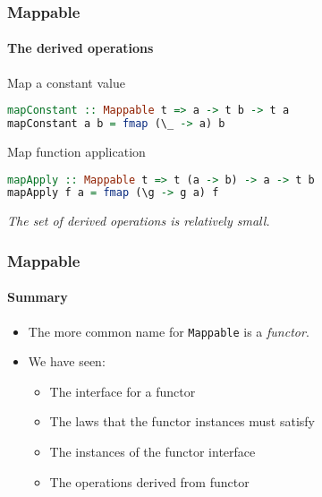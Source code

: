 \begin{frame}[fragile]
\frametitle{Mappable}
\framesubtitle{The derived operations}
\begin{block}{Map a constant value}
\begin{lstlisting}[style=language,language=haskell]
mapConstant :: Mappable t => a -> t b -> t a
mapConstant a b = fmap (\_ -> a) b
\end{lstlisting}
\end{block}
\begin{block}{Map function application}
\begin{lstlisting}[style=language,language=haskell]
mapApply :: Mappable t => t (a -> b) -> a -> t b
mapApply f a = fmap (\g -> g a) f
\end{lstlisting}
\end{block}
\emph{The set of derived operations is relatively small.}
\end{frame}

\begin{frame}[fragile]
\frametitle{Mappable}
\framesubtitle{Summary}
\begin{itemize}
\item The more common name for \lstinline{Mappable} is a \emph{functor}.
\item We have seen:
  \begin{itemize}
  \item The interface for a functor
  \item The laws that the functor instances must satisfy
  \item The instances of the functor interface
  \item The operations derived from functor
  \end{itemize}
\end{itemize}
\end{frame}
